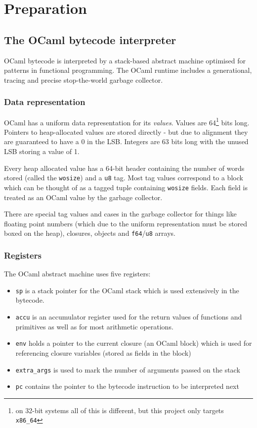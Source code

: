 \chapter{Preparation}

\section{The OCaml bytecode interpreter}

OCaml bytecode is interpreted by a stack-based abstract machine optimised for patterns in
functional programming. The OCaml runtime includes a generational, tracing and precise
stop-the-world garbage collector.

\subsection{Data representation}

OCaml has a uniform data representation for its \emph{values}. Values are 64\footnote{on 32-bit
    systems all of this is different, but this project only targets \texttt{x86\_64}} bits long.
Pointers to heap-allocated values are stored directly - but due to alignment they are guaranteed to
have a 0 in
the LSB. Integers are 63 bits long with the unused LSB storing a value of 1.

Every heap allocated value has a 64-bit header containing the number of words stored (called
the \texttt{wosize}) and a \texttt{u8} tag. Most tag values correspond to a block which can be
thought of as a tagged tuple containing \texttt{wosize} fields. Each field is treated as an OCaml
value by the garbage collector.

There are special tag values and cases in the garbage collector for things like floating point
numbers (which due to the uniform representation must be stored boxed on the heap),
closures, objects and \texttt{f64}/\texttt{u8} arrays.

\subsection{Registers}

The OCaml abstract machine uses five registers:

\begin{itemize}
    \item \texttt{sp} is a stack pointer for the OCaml stack which is used extensively
          in the bytecode.
    \item \texttt{accu} is an accumulator register used for the return values of functions
          and primitives as well as for most arithmetic operations.
    \item \texttt{env} holds a pointer to the current closure (an OCaml block) which is used for
          referencing closure variables (stored as fields in the block)
    \item \texttt{extra\_args} is used to mark the number of arguments passed on the stack
    \item \texttt{pc} contains the pointer to the bytecode instruction to be interpreted next
\end{itemize}

